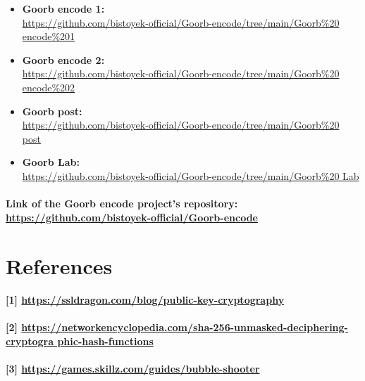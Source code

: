 \documentclass[oneside]{book}
\newcommand{\myparagraph}[1]{\paragraph{\textnormal{#1}}}
\begin{document}
\begin{itemize}
\item \textbf{Goorb encode 1:} \\ \href{https://github.com/bistoyek-official/Goorb-encode/tree/main/Goorb\%20enco \newline de\%201}{https://github.com/bistoyek-official/Goorb-encode/tree/main/Goorb\%20 \newline encode\%201}
\item \textbf{Goorb encode 2:} \\ \href{https://github.com/bistoyek-official/Goorb-encode/tree/main/Goorb\%20encode\%202}{https://github.com/bistoyek-official/Goorb-encode/tree/main/Goorb\%20 \newline encode\%202} 
\item \textbf{Goorb post:} \\ \href{https://github.com/bistoyek-official/Goorb-encode/tree/main/Goorb\%20post}{https://github.com/bistoyek-official/Goorb-encode/tree/main/Goorb\%20 \newline post} 
\item \textbf{Goorb Lab:} \\ \href{https://github.com/bistoyek-official/Goorb-encode/tree/main/Goorb\%20Lab}{https://github.com/bistoyek-official/Goorb-encode/tree/main/Goorb\%20 \newline Lab}
\end{itemize}

\myparagraph{
Link of the \textbf{Goorb encode} project's repository:\\
\href{https://github.com/bistoyek-official/Goorb-encode}{https://github.com/bistoyek-official/Goorb-encode}
}

\newpage

\section{References}

\myparagraph{
[1] \href{https://ssldragon.com/blog/public-key-cryptography}{https://ssldragon.com/blog/public-key-cryptography}
}

\myparagraph{
[2] \href{https://networkencyclopedia.com/sha-256-unmasked-deciphering-cryptographic-hash-functions}{https://networkencyclopedia.com/sha-256-unmasked-deciphering-cryptogra \newline phic-hash-functions}
}

\myparagraph{
[3] \href{https://games.skillz.com/guides/bubble-shooter}{https://games.skillz.com/guides/bubble-shooter}
}
\end{document}
